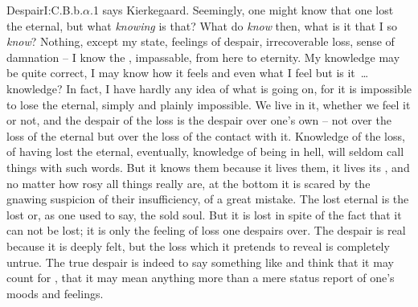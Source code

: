 \citet{To despair is to lose the eternal}{Despair}{I:C.B.b.$\alpha$.1} says Kierkegaard.  Seemingly, one
  might know that one lost the eternal, but what {\em knowing} is that? What do
   {\em know} then, what is it that I so {\em know}? Nothing, except my
   state, feelings of despair, irrecoverable loss, sense of damnation
  -- I know the , impassable, from here to eternity.  My knowledge may
  be quite correct, I may know how it feels and even what I feel but is it~\ldots
  knowledge? In fact, I have hardly any idea of what is going on, for it is
  impossible to lose the eternal, simply and plainly impossible. We live in it,
  whether we feel it or not, and the despair of the loss is the despair over
  one's own  -- not over the loss of the eternal but over the loss
  of the contact with it.  Knowledge of the loss, of having lost the eternal,
  eventually, knowledge of being in hell, will seldom call things with such
  words.  But it knows them because it lives them, it lives its \No, and no
  matter how rosy all  things really are, at the bottom it is scared
  by the gnawing suspicion of their insufficiency, of a great mistake. The lost
  eternal is the lost  or, as one used to say, the sold soul. But
  it is lost in spite of the fact that it can not be lost; it is only the
  feeling of loss one despairs over. The despair is real because it is deeply
  felt, but the loss which it pretends to reveal is completely untrue. The true despair is indeed to
  say something like  and think that it may count
  for , that it may mean anything more than a mere status report of
  one's moods and feelings.
  
